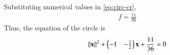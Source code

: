 Substituting numerical values
	in \eqref{eq:circ-cr},
\begin{align}
	f
	=\frac{11}{36}
\end{align}
	Thus, the equation of the circle is
\begin{align}
	\left\lVert\mathbf{x}\right\rVert^2 + \begin{pmatrix}-1 & -\frac{1}{2}\end{pmatrix}\mathbf{x}+\frac{11}{36}=0
\end{align}

